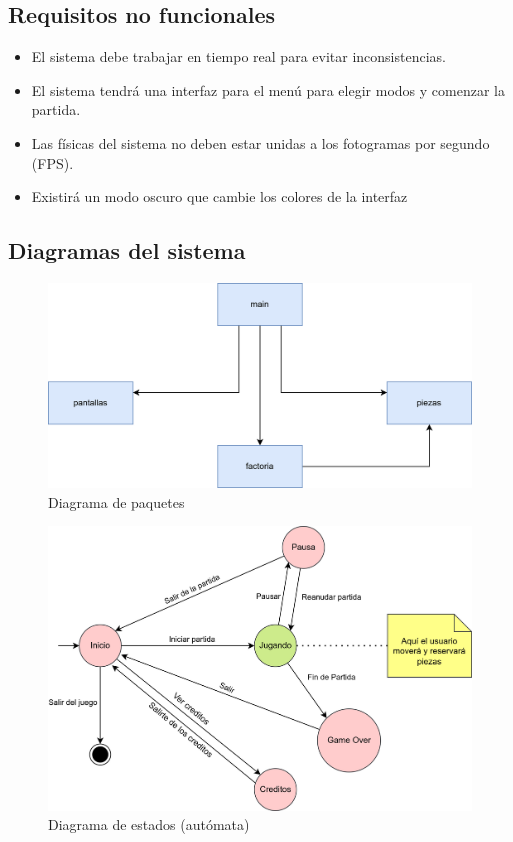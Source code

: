 \documentclass{article}
\begin{document}
\subsection{Requisitos no funcionales}
\begin{itemize}
    \item El sistema debe trabajar en tiempo real para evitar inconsistencias.
    \item El sistema tendrá una interfaz para el menú para elegir modos y comenzar la partida.
    \item Las físicas del sistema no deben estar unidas a los fotogramas por segundo (FPS).
    \item Existirá un modo oscuro que cambie los colores de la interfaz


\end{itemize}
\subsection{Diagramas del sistema}
\begin{figure}[H]
        \includegraphics[width=\textwidth]{imagenes/paquetes.png}
        \caption{Diagrama de paquetes}
\end{figure}

\begin{figure}[H]
        \includegraphics[width=\textwidth]{imagenes/estados.png}
        \caption{Diagrama de estados (autómata)}
\end{figure}
\end{document}
